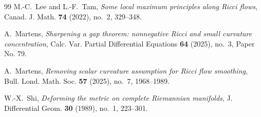 \documentclass{amsart}
\theoremstyle{definition}
\begin{document}
\begin{thebibliography}{99}
M.-C.~Lee and L.-F.~Tam,
\textit{Some local maximum principles along Ricci flows},
Canad. J. Math. \textbf{74} (2022), no.~2, 329--348.

A.~Martens,
\textit{Sharpening a gap theorem: nonnegative Ricci and small curvature concentration},
Calc. Var. Partial Differential Equations \textbf{64} (2025), no.~3, Paper No. 79.

A.~Martens,
\textit{Removing scalar curvature assumption for Ricci flow smoothing},
Bull. Lond. Math. Soc. \textbf{57} (2025), no.~7, 1968--1989.

W.-X.~Shi,
\textit{Deforming the metric on complete Riemannian manifolds},
J. Differential Geom. \textbf{30} (1989), no.~1, 223--301.



\end{thebibliography}

%
%
\end{document}
